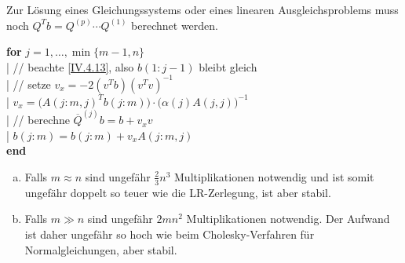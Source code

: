 Zur Lösung eines Gleichungssystems oder eines linearen Ausgleichsproblems
muss noch $Q^Tb=Q^{(p)}\dotsm Q^{(1)}$ berechnet werden.

\begin{pseudocode}{0.7\linewidth}
  \textbf{for} $j=1,\dotsc, \min\{m-1,n\}$\\
  |	\> // beachte \eqref{IV.4.13}, also $b(1:j-1)$ bleibt gleich\\
  |	\> // setze $v_x=-2(v^Tb)(v^Tv)^{-1}$\\
  |	\> $v_x=\big(A(j:m,j)^Tb(j:m)\big)\cdot \big(\alpha(j)A(j,j)\big)^{-1}$ \\
  |	\> // berechne $\overline{Q}^{(j)} b=b+v_xv$\\
  |	\> $b(j:m) = b(j:m)+v_xA(j:m,j)$\\
  \textbf{end}
\end{pseudocode}


\begin{enumerate}[a)]
\item Falls $m\approx n$ sind ungefähr $\frac{2}{3}n^3$ Multiplikationen notwendig
  und ist somit ungefähr doppelt so teuer wie die LR-Zerlegung, ist aber stabil.
\item Falls $m\gg n$ sind ungefähr $2mn^2$ Multiplikationen notwendig.
  Der Aufwand ist daher ungefähr so hoch wie beim Cholesky-Verfahren für Normalgleichungen,
  aber stabil.
\end{enumerate}

